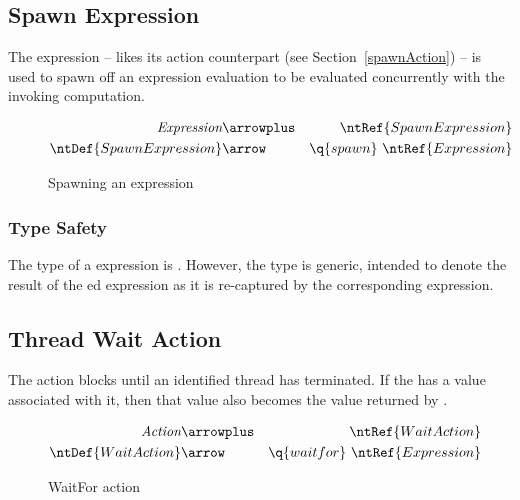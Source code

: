 \begin{prooftree}
\end{prooftree}

\subsection{Spawn Expression}
\label{spawnExpression}
The  expression -- likes its action counterpart (see Section~\vref{spawnAction}) -- is used to spawn off an expression evaluation to be evaluated concurrently with the invoking computation.

\begin{figure}[htbp]
\begin{eqnarray*}
\emph{Expression}&\arrowplus&\ntRef{SpawnExpression}\\
\ntDef{SpawnExpression}&\arrow&\q{spawn}\ \ntRef{Expression}
\end{eqnarray*}
\caption{Spawning an expression}\label{spawnExpressionSyntaxFig}
\end{figure}

\subsubsection{Type Safety}
The type of a  expression is . However, the  type is generic, intended to denote the result of the ed expression as it is re-captured by the corresponding  expression.

\begin{prooftree}
\end{prooftree}

\subsection{Thread Wait Action}
\label{threadWaitAction}
The  action blocks until an identified thread has terminated. If the  has a value associated with it, then that value also becomes the value returned by .

\begin{figure}[htbp]
\begin{eqnarray*}
\emph{Action}&\arrowplus&\ntRef{WaitAction}\\
\ntDef{WaitAction}&\arrow&\q{waitfor}\ \ntRef{Expression}
\end{eqnarray*}
\caption{WaitFor action}\label{waitforActionSyntaxFig}
\end{figure}

